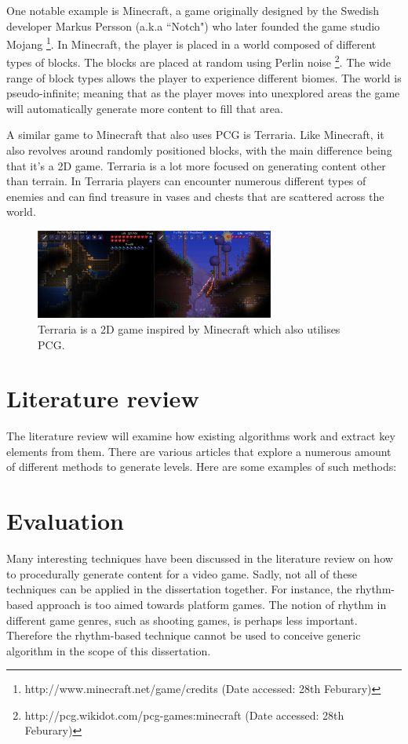 \documentclass{ueacmpstyle}
\begin{document}
One notable example is Minecraft, a game originally designed by the Swedish developer Markus Persson (a.k.a ``Notch") who later founded the game studio Mojang \footnote{http://www.minecraft.net/game/credits (Date accessed: 28th Feburary)}. In Minecraft, the player is placed in a world composed of different types of blocks. The blocks are placed at random using Perlin noise \footnote{http://pcg.wikidot.com/pcg-games:minecraft (Date accessed: 28th Feburary)}. The wide range of block types allows the player to experience different biomes.  The world is pseudo-infinite; meaning that as the player moves into unexplored areas the game will automatically generate more content to fill that area.

A similar game to Minecraft that also uses PCG is Terraria. Like Minecraft, it also revolves around randomly positioned blocks, with the main difference being that it's a 2D game. Terraria is a lot more focused on generating content other than terrain. In Terraria players can encounter numerous different types of enemies and can find treasure in vases and chests that are scattered across the world.
\begin{figure}[h!]
  \centering
    \includegraphics[width=0.7\textwidth]{images/terraria.png}
\caption{Terraria is a 2D game inspired by Minecraft which also utilises PCG.}
\end{figure}

\section{Literature review}
The literature review will examine how existing algorithms work and extract key elements from them. There are various articles that explore a numerous amount of different methods to generate levels. Here are some examples of such methods:






\section{Evaluation}
Many interesting techniques have been discussed in the literature review on how to procedurally generate content for a video game. Sadly, not all of these techniques can be applied in the dissertation together. For instance, the rhythm-based approach is too aimed towards platform games. The notion of rhythm in different game genres, such as shooting games, is perhaps less important. Therefore the rhythm-based technique cannot be used to conceive generic algorithm in the scope of this dissertation. 
\end{document}
